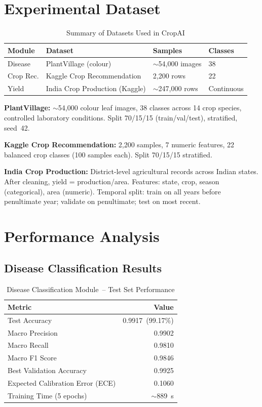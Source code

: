 \documentclass[12pt,a4paper]{report}
\begin{document}
\section{Experimental Dataset}
\begin{table}[h!]
\centering
\renewcommand{\arraystretch}{1.3}
\caption{Summary of Datasets Used in CropAI}
\label{tab:datasets}
\begin{tabular}{|L{2.5cm}|L{5cm}|L{3cm}|C{2cm}|}
\hline
\textbf{Module} & \textbf{Dataset} & \textbf{Samples} & \textbf{Classes} \\
\hline
Disease & PlantVillage (colour) & $\sim$54,000 images & 38 \\
\hline
Crop Rec. & Kaggle Crop Recommendation & 2,200 rows & 22 \\
\hline
Yield & India Crop Production (Kaggle) & $\sim$247,000 rows & Continuous \\
\hline
\end{tabular}
\end{table}

\noindent\textbf{PlantVillage:} $\sim$54,000 colour leaf images, 38 classes across 14 crop species, controlled laboratory conditions. Split 70/15/15 (train/val/test), stratified, seed~42.

\noindent\textbf{Kaggle Crop Recommendation:} 2,200 samples, 7 numeric features, 22 balanced crop classes (100 samples each). Split 70/15/15 stratified.

\noindent\textbf{India Crop Production:} District-level agricultural records across Indian states. After cleaning, yield = production/area. Features: state, crop, season (categorical), area (numeric). Temporal split: train on all years before penultimate year; validate on penultimate; test on most recent.

\section{Performance Analysis}

\subsection{Disease Classification Results}
\begin{table}[h!]
\centering
\renewcommand{\arraystretch}{1.3}
\caption{Disease Classification Module~-- Test Set Performance}
\label{tab:disease_results}
\begin{tabular}{|L{7.5cm}|r|}
\hline
\textbf{Metric} & \textbf{Value} \\
\hline
Test Accuracy & 0.9917~(99.17\%) \\
\hline
Macro Precision & 0.9902 \\
\hline
Macro Recall & 0.9810 \\
\hline
Macro F1 Score & 0.9846 \\
\hline
Best Validation Accuracy & 0.9925 \\
\hline
Expected Calibration Error (ECE) & 0.1060 \\
\hline
Training Time (5 epochs) & $\sim$889~s \\
\hline
\end{tabular}
\end{table}
\end{document}
